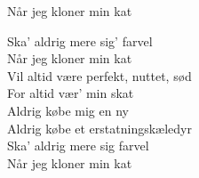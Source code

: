 \begin{song}{Når jeg kloner min kat}
  \begin{SBChorus}
    Ska' aldrig mere sig' farvel\\
    Når jeg kloner min kat\\
    Vil altid være perfekt, nuttet, sød\\
    For altid vær' min skat\\
    Aldrig købe mig en ny\\
    Aldrig købe et erstatningskæledyr\\
    Ska' aldrig mere sig farvel\\
    Når jeg kloner min kat
  \end{SBChorus}


\end{song}